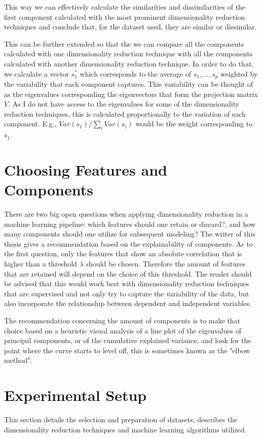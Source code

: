 This way we can effectively calculate the similarities and dissimilarities of the first component calculated with the most prominent dimensionality reduction techniques and conclude that, for the dataset used, they are similar or dissimilar.

This can be further extended so that the we can compare all the components calculated with one dimensionality reduction technique with all the components calculated with another dimensionality reduction technique. In order to do that, we calculate a vector $s_1^*$ which corresponds to the average of $s_1, ..., s_p$ weighted by the variability that each component captures. This variability can be thought of as the eigenvalues corresponding the eigenvectors that form the projection matrix $V$. As I do not have access to the eigenvalues for some of the dimensionality reduction techniques, this is calculated proportionally to the variation of each component. E.g., $Var(s_1)/\sum_i Var(s_i)$ would be the weight corresponding to $s_1$.

\section{Choosing Features and Components}
There are two big open questions when applying dimensionality reduction in a machine learning pipeline: which features should one retain or discard?, and how many components should one utilize for subsequent modeling?
The writer of this thesis gives a recommendation based on the explainability of components. As to the first question, only the features that show an absolute correlation that is higher than a threshold $\lambda$ should be chosen. Therefore the amount of features that are retained will depend on the choice of this threshold. The reader should be advised that this would work best with dimensionality reduction techniques that are supervised and not only try to capture the variability of the data, but also incorporate the relationship between dependent and independent variables.

The recommendation concerning the amount of components is to make that choice based on a heuristic visual analysis of a line plot of the eigenvalues of principal components, or of the cumulative explained variance, and look for the point where the curve starts to level off, this is sometimes known as the "elbow method".

\section{Experimental Setup}
This section details the selection and preparation of datasets, describes the dimensionality reduction techniques and machine learning algorithms utilized.


